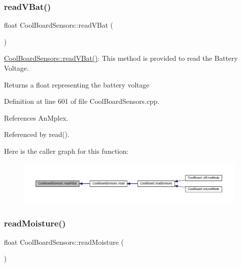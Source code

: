 \subsubsection{\texorpdfstring{read\+V\+Bat()}{readVBat()}}
{\footnotesize\ttfamily float Cool\+Board\+Sensors\+::read\+V\+Bat (\begin{DoxyParamCaption}{ }\end{DoxyParamCaption})}

\hyperlink{class_cool_board_sensors_a6944b6ea7bce8e2fce1b434acfd9d5f3}{Cool\+Board\+Sensors\+::read\+V\+Bat()}\+: This method is provided to read the Battery Voltage.

\begin{DoxyReturn}{Returns}
a float representing the battery voltage 
\end{DoxyReturn}


Definition at line 601 of file Cool\+Board\+Sensors.\+cpp.



References An\+Mplex.



Referenced by read().

Here is the caller graph for this function\+:
\nopagebreak
\begin{figure}[H]
\begin{center}
\leavevmode
\includegraphics[width=350pt]{de/d46/class_cool_board_sensors_a6944b6ea7bce8e2fce1b434acfd9d5f3_icgraph}
\end{center}
\end{figure}
\mbox{\label{class_cool_board_sensors_a8761bff50373c485f4465c8db47d0633}} 
\subsubsection{\texorpdfstring{read\+Moisture()}{readMoisture()}}
{\footnotesize\ttfamily float Cool\+Board\+Sensors\+::read\+Moisture (\begin{DoxyParamCaption}{ }\end{DoxyParamCaption})}

